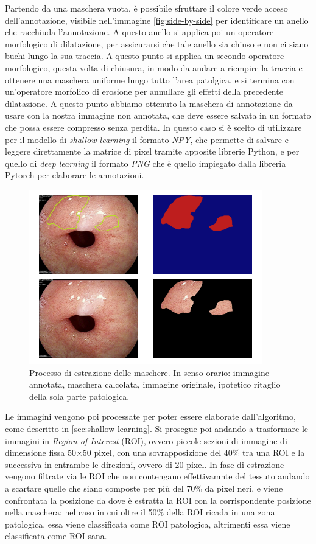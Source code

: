 Partendo da una maschera vuota, è possibile sfruttare il colore
verde acceso dell'annotazione, visibile nell'immagine \ref{fig:side-by-side}
per identificare un anello che racchiuda l'annotazione.
A questo anello si applica poi un operatore morfologico di dilatazione,
per assicurarsi che tale anello sia chiuso e non ci siano buchi lungo la
sua traccia.
A questo punto si applica un secondo operatore morfologico, questa
volta di chiusura, in modo da andare a riempire la traccia e ottenere
una maschera uniforme lungo tutto l'area patolgica, e si termina
con un'operatore morfolico di erosione per annullare gli effetti della
precedente dilatazione.
A questo punto abbiamo ottenuto la maschera di annotazione da
usare con la nostra immagine non annotata, che deve essere
salvata in un formato che possa essere compresso senza perdita.
In questo caso si è scelto di utilizzare per il modello di 
{\it shallow learning} il formato {\it NPY}, che permette di salvare
e leggere direttamente la matrice di pixel tramite apposite
librerie Python, e per quello di {\it deep learning} il formato
{\it PNG} che è quello impiegato dalla libreria Pytorch per
elaborare le annotazioni.


\begin{figure}[h]
    \center
    \includegraphics[width=0.9\textwidth]{./assets/cutout2.png}
    \caption{\label{fig:cutout}Processo di estrazione delle maschere.
    In senso orario: immagine annotata, maschera calcolata, immagine originale,
    ipotetico ritaglio della sola parte patologica.}
\end{figure}

Le immagini vengono poi processate per poter essere elaborate
dall'algoritmo, come descritto in \ref{sec:shallow-learning}.
Si prosegue poi andando a trasformare le immagini in
{\it Region of Interest} (ROI), ovvero piccole sezioni di immagine
di dimensione fissa 50$\times$50 pixel, con una sovrapposizione
del 40\% tra una ROI e la successiva in entrambe le direzioni,
ovvero di 20 pixel.
In fase di estrazione vengono filtrate via le ROI che non contengano
effettivamnte del tessuto andando a scartare quelle che siano
composte per più del 70\% da pixel neri, e viene confrontata
la posizione da dove è estratta la ROI con la corrispondente
posizione nella maschera: nel caso in cui oltre il 50\% della ROI
ricada in una zona patologica, essa viene classificata come ROI
patologica, altrimenti essa viene classificata come ROI sana.

